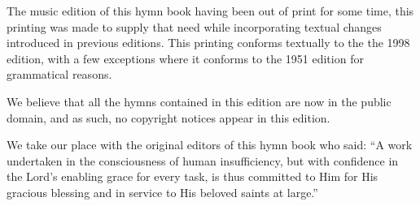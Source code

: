 \documentclass{book}
\begin{document}
The music edition of this hymn book having been out of print for some time,
this printing was made to supply that need while incorporating textual changes
introduced in previous editions. This printing conforms textually to the the
1998 edition, with a few exceptions where it conforms to the 1951 edition for
grammatical reasons.

We believe that all the hymns contained in this edition are now in the public
domain, and as such, no copyright notices appear in this edition.

We take our place with the original editors of this hymn book who said: ``A
work undertaken in the consciousness of human insufficiency, but with
confidence in the Lord's enabling grace for every task, is thus committed to
Him for His gracious blessing and in service to His beloved saints at large.''

\vspace*{\fill}

\afterpage{\null\newpage}

\restoregeometry



\restoregeometry

\end{document}
